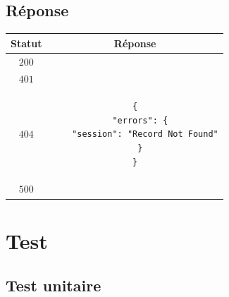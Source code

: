 \documentclass[titlepage, 12pt]{report}
\begin{document}
\subsection{Réponse}

\begin{center}
	\begin{tabular}{|c|c|}
		\hline
		Statut & Réponse \\
		\hline
		$ 200 $ & \\ 
		\hline
		$ 401 $ & \\
		\hline
		$ 404 $ & \begin{lstlisting}
{
  "errors": {
    "session": "Record Not Found"
  }
}
		\end{lstlisting} \\
		\hline
		$ 500 $ & \\
		\hline
	\end{tabular}
\end{center} 

\section{Test}

\subsection{Test unitaire}
\end{document}
